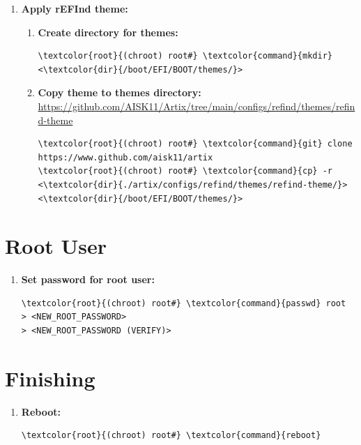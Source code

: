 \documentclass[10pt, a4paper, onecolumn, oneside, titlepage, openany]{book}
\begin{document}
\begin{enumerate}
\begin{Verbatim}[commandchars=\\\{\}]
menuentry "Artix" \{
    #volume  "ESP"
    icon    /EFI/BOOT/themes/refind-theme/icons/128-48/os_artix.png
    loader  /EFI/artix/vmlinuz-linux
    options "initrd=/EFI/artix/intel-ucode.img \char92
    initrd=/EFI/artix/initramfs-linux.img \char92
    rw root=/dev/mapper/luks-root quiet"
    #disabled
\}
\end{Verbatim}
    \item \textbf{Apply rEFInd theme:}
    \begin{enumerate}
        \item \textbf{Create directory for themes:}
\begin{Verbatim}[commandchars=\\\{\}]
\textcolor{root}{(chroot) root#} \textcolor{command}{mkdir} <\textcolor{dir}{/boot/EFI/BOOT/themes/}>
\end{Verbatim}
        \item \textbf{Copy theme to themes directory:}
\newline \url{https://github.com/AISK11/Artix/tree/main/configs/refind/themes/refind-theme}
\begin{Verbatim}[commandchars=\\\{\}]
\textcolor{root}{(chroot) root#} \textcolor{command}{git} clone https://www.github.com/aisk11/artix
\textcolor{root}{(chroot) root#} \textcolor{command}{cp} -r <\textcolor{dir}{./artix/configs/refind/themes/refind-theme/}>
<\textcolor{dir}{/boot/EFI/BOOT/themes/}>
\end{Verbatim}
    \end{enumerate}
\end{enumerate}

\section{Root User}
\begin{enumerate}
    \item \textbf{Set password for root user:}
\begin{Verbatim}[commandchars=\\\{\}]
\textcolor{root}{(chroot) root#} \textcolor{command}{passwd} root
> <NEW_ROOT_PASSWORD>
> <NEW_ROOT_PASSWORD (VERIFY)>
\end{Verbatim}
\end{enumerate}

\section{Finishing}
\begin{enumerate}
    \item \textbf{Reboot:}
\begin{Verbatim}[commandchars=\\\{\}]
\textcolor{root}{(chroot) root#} \textcolor{command}{reboot}
\end{Verbatim}
\end{enumerate}
\end{document}
